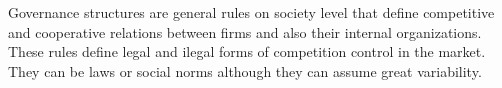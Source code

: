 \documentclass[a4paper, 12pt, openright, oneside, german, french, brazil, english]{abntex2}
\begin{document}
	
	
	Governance structures are general rules on society level that define competitive and cooperative relations between firms and also their internal organizations. These rules define legal and ilegal forms of competition control in the market. They can be laws or social norms although they can assume great variability.
	
	
	
\end{document}
